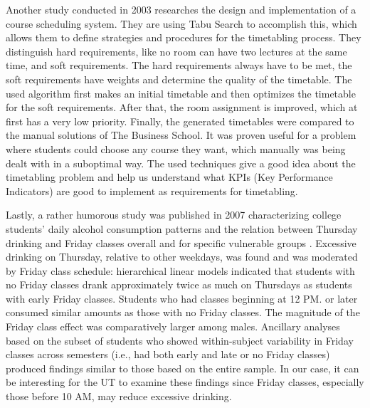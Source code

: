 Another study conducted in 2003 \cite{designAndImplementationOfACourseSchedulingSystem} researches the design and implementation of a course scheduling system. They are using Tabu Search to accomplish this, which allows them to define strategies and procedures for the timetabling process. They distinguish hard requirements, like no room can have two lectures at the same time, and soft requirements. The hard requirements always have to be met, the soft requirements have weights and determine the quality of the timetable. The used algorithm first makes an initial timetable and then optimizes the timetable for the soft requirements. After that, the room assignment is improved, which at first has a very low priority. Finally, the generated timetables were compared to the manual solutions of The Business School. It was proven useful for a problem where students could choose any course they want, which manually was being dealt with in a suboptimal way. The used techniques give a good idea about the timetabling problem and help us understand what KPIs (Key Performance Indicators) are good to implement as requirements for timetabling.

Lastly, a rather humorous study was published in 2007 characterizing college students’ daily alcohol consumption patterns and the relation between Thursday drinking and Friday classes overall and for specific vulnerable groups \cite{collegeStudentAlcoholConsumption}. Excessive drinking on Thursday, relative to other weekdays, was found and was moderated by Friday class schedule: hierarchical linear models indicated that students with no Friday classes drank approximately twice as much on Thursdays as students with early Friday classes. Students who had classes beginning at 12 PM. or later consumed similar amounts as those with no Friday classes. The magnitude of the Friday class effect was comparatively larger among males. Ancillary analyses based on the subset of students who showed within-subject variability in Friday classes across semesters (i.e., had both early and late or no Friday classes) produced findings similar to those based on the entire sample. In our case, it can be interesting for the UT to examine these findings since Friday classes, especially those before 10 AM, may reduce excessive drinking.
